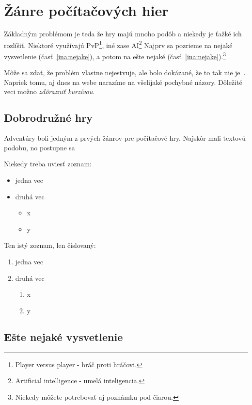 \documentclass[10pt,twoside,slovak,a4paper]{coursepaper}
\begin{document}
\section{Žánre počítačových hier} \label{zanre}

Základným problémom je teda že hry majú mnoho podôb a niekedy je ťažké ich rozlíšiť. Niektoré využívajú PvP\footnote{Player versus player - hráč proti hráčovi.}, iné zase AI\footnote{Artificial intelligence - umelá inteligencia.}
Najprv sa pozrieme na nejaké vysvetlenie (časť~\ref{ina:nejake}), a potom na ešte nejaké (časť~\ref{ina:nejake}).\footnote{Niekedy môžete potrebovať aj poznámku pod čiarou.}

Môže sa zdať, že problém vlastne nejestvuje\cite{Coplien:MPD}, ale bolo dokázané, že to tak nie je~\cite{Czarnecki:Staged, Czarnecki:Progress}. Napriek tomu, aj dnes na webe narazíme na všelijaké pochybné názory\cite{PLP-Framework}. Dôležité veci možno \emph{zdôrazniť kurzívou}.


\subsection{Dobrodružné hry} \label{zanre:adventure}

Adventúry boli jedným z prvých žánrov pre počítačové hry. Najskôr mali textovú podobu, no postupne sa

Niekedy treba uviesť zoznam:

\begin{itemize}
\item jedna vec
\item druhá vec
	\begin{itemize}
	\item x
	\item y
	\end{itemize}
\end{itemize}

Ten istý zoznam, len číslovaný:

\begin{enumerate}
\item jedna vec
\item druhá vec
	\begin{enumerate}
	\item x
	\item y
	\end{enumerate}
\end{enumerate}


\subsection{Ešte nejaké vysvetlenie} \label{ina:este}
\end{document}
